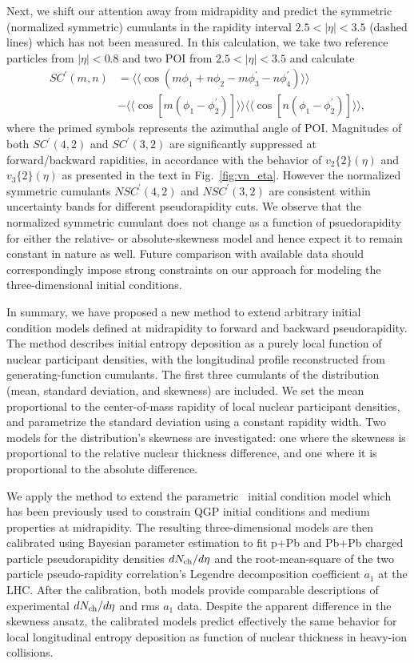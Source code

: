 Next, we shift our attention away from midrapidity and predict the symmetric (normalized symmetric) cumulants in the rapidity interval $2.5 < |\eta| < 3.5$ (dashed lines) which has not been measured.
In this calculation, we take two reference particles from $|\eta| < 0.8$ and two POI from $2.5 < |\eta| < 3.5$ and calculate
\begin{align}
SC^\prime(m, n) &= \langle\langle \cos(m\phi_1+n\phi_2-m\phi_3^\prime-n\phi_4^\prime)\rangle\rangle \\
\nonumber &- \langle\langle\cos[m(\phi_1-\phi_2^\prime)]\rangle\rangle\langle\langle\cos[n(\phi_1-\phi_2^\prime)]\rangle\rangle, \label{eq:scmn}
\end{align}
where the primed symbols represents the azimuthal angle of POI.
Magnitudes of both $SC^\prime(4, 2)$ and $SC^\prime(3, 2)$ are significantly suppressed at forward/backward rapidities, in accordance with the behavior of $v_2\{2\}(\eta)$ and $v_3\{2\}(\eta)$ as presented in the text in Fig.~\ref{fig:vn_eta}.
However the normalized symmetric cumulants $NSC^\prime(4,2)$ and $NSC^\prime(3,2)$ are consistent within uncertainty bands for different pseudorapidity cuts.
We observe that the normalized symmetric cumulant does not change as a function of psuedorapidity for either the relative- or absolute-skewness model and hence expect it to remain constant in nature as well.
Future comparison with available data should correspondingly impose strong constraints on our approach for modeling the three-dimensional initial conditions.


In summary, we have proposed a new method to extend arbitrary initial condition models defined at midrapidity to forward and backward pseudorapidity.
The method describes initial entropy deposition as a purely local function of nuclear participant densities, with the longitudinal profile reconstructed from generating-function cumulants.
The first three cumulants of the distribution (mean, standard deviation, and skewness) are included.
We set the mean proportional to the center-of-mass rapidity of local nuclear participant densities, and parametrize the standard deviation using a constant rapidity width.
Two models for the distribution's skewness are investigated: one where the skewness is proportional to the relative nuclear thickness difference, and one where it is proportional to the absolute difference.

We apply the method to extend the parametric \trento\ initial condition model which has been previously used to constrain QGP initial conditions and medium properties at midrapidity. 
The resulting three-dimensional models are then calibrated using Bayesian parameter estimation to fit p+Pb and Pb+Pb charged particle pseudorapidity densities $dN_\text{ch}/d\eta$ and the root-mean-square of the two particle pseudo-rapidity correlation's Legendre decomposition coefficient $a_1$ at the LHC.
After the calibration, both models provide comparable descriptions of experimental $dN_\text{ch}/d\eta$ and rms $a_1$ data.
Despite the apparent difference in the skewness ansatz, the calibrated models predict effectively the same behavior for local longitudinal entropy deposition as function of nuclear thickness in heavy-ion collisions.

